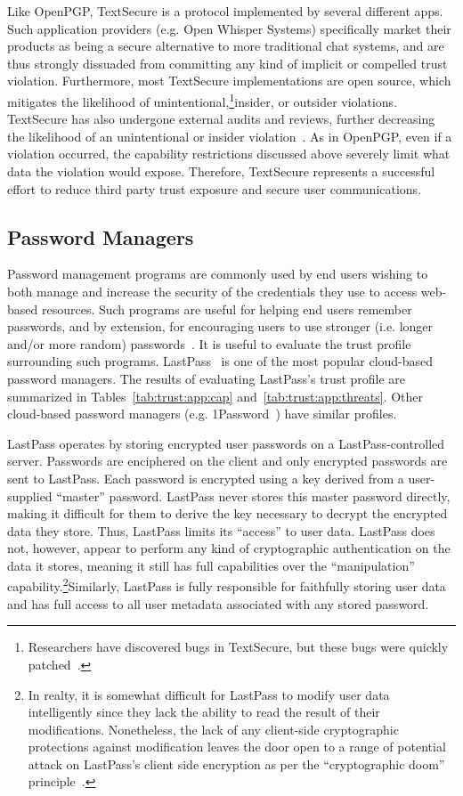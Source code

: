 Like OpenPGP, TextSecure is a protocol implemented by several
different apps. Such application providers (e.g. Open Whisper Systems)
specifically market their products as being a secure alternative to
more traditional chat systems, and are thus strongly dissuaded from
committing any kind of implicit or compelled trust
violation. Furthermore, most TextSecure implementations are open
source, which mitigates the likelihood of
unintentional,\footnote{Researchers have discovered bugs in
  TextSecure, but these bugs were quickly
  patched~\cite{frosch2014}.}insider, or outsider
violations. TextSecure has also undergone external audits and reviews,
further decreasing the likelihood of an unintentional or insider
violation~\cite{frosch2014}. As in OpenPGP, even if a violation
occurred, the capability restrictions discussed above severely limit
what data the violation would expose. Therefore, TextSecure represents
a successful effort to reduce third party trust exposure and secure
user communications.

\subsection{Password Managers}

Password management programs are commonly used by end users wishing to
both manage and increase the security of the credentials they use to
access web-based resources. Such programs are useful for helping end
users remember passwords, and by extension, for encouraging users to
use stronger (i.e. longer and/or more random)
passwords~\cite{brodkin-passman, krebs-passwords,
  schneier-passwords}. It is useful to evaluate the trust profile
surrounding such programs. LastPass~\cite{lastpass} is one of the most
popular cloud-based password managers. The results of evaluating
LastPass's trust profile are summarized in
Tables~\ref{tab:trust:app:cap} and~\ref{tab:trust:app:threats}. Other
cloud-based password managers (e.g. 1Password~\cite{onepassword}) have
similar profiles.

LastPass operates by storing encrypted user passwords on a
LastPass-controlled server. Passwords are enciphered on the client and
only encrypted passwords are sent to LastPass. Each password is
encrypted using a key derived from a user-supplied ``master''
password. LastPass never stores this master password directly, making
it difficult for them to derive the key necessary to decrypt the
encrypted data they store. Thus, LastPass limits its ``access'' to
user data. LastPass does not, however, appear to perform any kind of
cryptographic authentication on the data it stores, meaning it still
has full capabilities over the ``manipulation''
capability.\footnote{In realty, it is somewhat difficult for LastPass
  to modify user data intelligently since they lack the ability to
  read the result of their modifications. Nonetheless, the lack of any
  client-side cryptographic protections against modification leaves
  the door open to a range of potential attack on LastPass's client
  side encryption as per the ``cryptographic doom''
  principle~\cite{marlinspike-doom}.}Similarly, LastPass is fully
responsible for faithfully storing user data and has full access to
all user metadata associated with any stored password.

